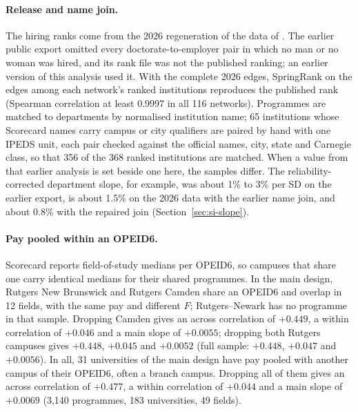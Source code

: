 \documentclass[11pt]{article}
\begin{document}
\paragraph{Release and name join.} The hiring ranks come from the 2026 regeneration of the data of
\citet{wapman2022quantifying} \citep{wapman2026data}. The earlier
public export \citep[Zenodo version 1;][]{wapman2022data} omitted every doctorate-to-employer pair in which no man or
no woman was hired, and its rank file was not the published ranking; an earlier version of this analysis used it. With the
complete 2026 edges, SpringRank on the edges among each network's ranked institutions reproduces the published rank
(Spearman correlation at least 0.9997 in all 116 networks). Programmes are matched to departments by normalised
institution name; 65 institutions whose Scorecard names carry campus or city qualifiers are paired by hand with one
IPEDS unit, each pair checked against the official names, city, state and Carnegie class, so that 356 of the 368
ranked institutions are matched. When a value from that earlier analysis is set beside one here, the samples differ. The
reliability-corrected department slope, for example, was about 1\% to 3\% per SD on the earlier export, is about
1.5\% on the 2026 data with the earlier name join, and about 0.8\% with the repaired join (Section~\ref{sec:si-slope}).

\paragraph{Pay pooled within an OPEID6.} Scorecard reports field-of-study medians per OPEID6, so campuses that share
one carry identical medians for their shared programmes. In the main design, Rutgers New Brunswick and Rutgers Camden
share an OPEID6 and overlap in 12 fields, with the same pay and different $F$; Rutgers--Newark has no programme in
that sample. Dropping Camden gives an across correlation of $+0.449$, a within correlation of $+0.046$ and a main
slope of $+0.0055$; dropping both Rutgers campuses gives $+0.448$, $+0.045$ and $+0.0052$ (full sample: $+0.448$,
$+0.047$ and $+0.0056$). In all, 31 universities of the main design have pay pooled with another campus of their
OPEID6, often a branch campus. Dropping all of them gives an across correlation of $+0.477$, a within correlation of
$+0.044$ and a main slope of $+0.0069$ (3,140 programmes, 183 universities, 49 fields).
\end{document}
